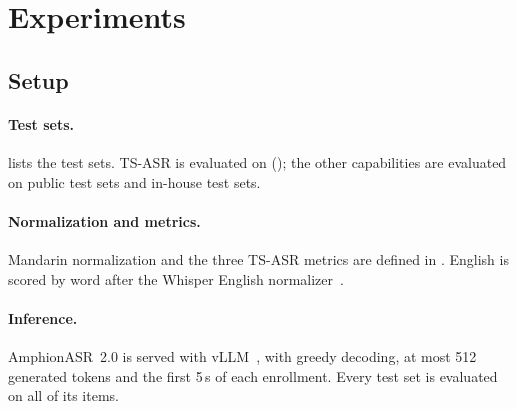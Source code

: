 
\section{Experiments}
\label{sec:experiments}

\subsection{Setup}
\label{subsec:exp_setup}

\paragraph{Test sets.}
 lists the test sets.
TS-ASR is evaluated on \tsbench (); the other capabilities are evaluated on public test sets and in-house test sets.

\paragraph{Normalization and metrics.}
Mandarin normalization and the three TS-ASR metrics are defined in .
English is scored by word after the Whisper English normalizer~\cite{radford2023robust}.

\paragraph{Inference.}
AmphionASR~2.0 is served with vLLM~\cite{kwon2023vllm}, with greedy decoding, at most 512 generated tokens and the first 5\,s of each enrollment.
Every test set is evaluated on all of its items.

